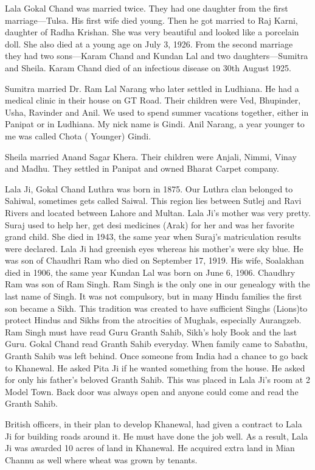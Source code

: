 Lala Gokal Chand was married twice. They had one daughter from the first marriage—Tulsa. His first wife died young. Then he got married to Raj Karni, daughter of Radha Krishan. She was very beautiful and looked like a porcelain doll. She also died at a young age on July 3, 1926. From the second marriage they had two sons—Karam Chand and Kundan Lal and two daughters—Sumitra and Sheila. Karam Chand died of an infectious disease on 30th August 1925. 

Sumitra married Dr. Ram Lal Narang who later settled in Ludhiana. He had a medical clinic in their house on GT Road. Their children were Ved, Bhupinder, Usha, Ravinder and Anil. We used to spend summer vacations together, either in Panipat or in Ludhiana. My nick name is Gindi. Anil Narang, a year younger to me was called Chota ( Younger) Gindi. 

Sheila married Anand Sagar Khera. Their children were Anjali, Nimmi, Vinay and Madhu. They settled in Panipat and owned Bharat Carpet company. 

Lala Ji, Gokal Chand Luthra was born in 1875. Our Luthra clan belonged to Sahiwal, sometimes gets called Saiwal. This region lies between Sutlej and Ravi Rivers and located between Lahore and Multan. Lala Ji’s mother was very pretty. Suraj used to help her, get desi medicines (Arak) for her and was her favorite grand child. She died in 1943, the same year when Suraj’s matriculation results were declared. Lala Ji had greenish eyes whereas his mother’s were sky blue. He was son of Chaudhri Ram who died on September 17, 1919. His wife, Soalakhan died in 1906, the same year Kundan Lal was born on June 6, 1906. Chaudhry Ram was son of Ram Singh. Ram Singh is the only one in our genealogy with the last name of Singh. It was not compulsory, but in many Hindu families the first son became a Sikh. This tradition was created to have sufficient Singhs (Lions)to protect Hindus and Sikhs from the atrocities of Mughals, especially Aurangzeb. Ram Singh must have read Guru Granth Sahib, Sikh’s holy Book and the last Guru. Gokal Chand read Granth Sahib everyday. When family came to Sabathu, Granth Sahib was left behind. Once someone from India had a chance to go back to Khanewal. He asked Pita Ji if he wanted something from the house. He asked for only his father’s beloved Granth Sahib. This was placed in Lala Ji’s room at 2 Model Town. Back door was always open and anyone could come and read the Granth Sahib. 

British officers, in their plan to develop Khanewal, had given a contract to Lala Ji for building roads around it. He must have done the job well. As a result, Lala Ji was awarded 10 acres of land in Khanewal. He acquired extra land in Mian Channu as well where wheat was grown by tenants. 


